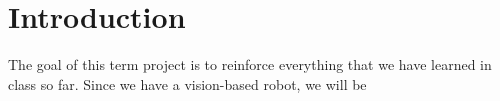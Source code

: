 
\section{Introduction}

The goal of this term project is to reinforce everything that we have learned	 in class so far. Since we have a vision-based robot, we will be 